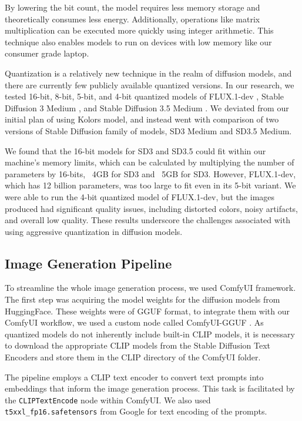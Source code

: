 \documentclass{article}
\begin{document}
By lowering the bit count, the model requires less memory storage and theoretically consumes less energy. Additionally, operations like matrix multiplication can be executed more quickly using integer arithmetic. This technique also enables models to run on devices with low memory like our consumer grade laptop.

Quantization is a relatively new technique in the realm of diffusion models, and there are currently few publicly available quantized versions. In our research, we tested 16-bit, 8-bit, 5-bit, and 4-bit quantized models of FLUX.1-dev \cite{flux}, Stable Diffusion 3 Medium \cite{sd3}, and Stable Diffusion 3.5 Medium \cite{sd3.5}. We deviated from our initial plan of using Kolors model, and instead went with comparison of two versions of Stable Diffusion family of models, SD3 Medium and SD3.5 Medium.


We found that the 16-bit models for SD3 and SD3.5 could fit within our machine's memory limits, which can be calculated by multiplying the number of parameters by 16-bits, ~4GB for SD3 and ~5GB for SD3. However, FLUX.1-dev, which has 12 billion parameters, was too large to fit even in its 5-bit variant.
We were able to run the 4-bit quantized model of FLUX.1-dev, but the images produced had significant quality issues, including distorted colors, noisy artifacts, and overall low quality. These results underscore the challenges associated with using aggressive quantization in diffusion models.

\subsection{Image Generation Pipeline}
To streamline the whole image generation process, we used ComfyUI \cite{comfyui} framework. The first step was acquiring the model weights for the diffusion models from HuggingFace. These weights were of GGUF format, to integrate them with our ComfyUI workflow, we used a custom node called ComfyUI-GGUF \cite{gguf}. As quantized models do not inherently include built-in CLIP \cite{clip} models, it is necessary to download the appropriate CLIP models from the Stable Diffusion Text Encoders and store them in the CLIP directory of the ComfyUI folder.

The pipeline employs a CLIP text encoder to convert text prompts into embeddings that inform the image generation process. This task is facilitated by the \texttt{CLIPTextEncode} node within ComfyUI. We also used \texttt{t5xxl\_fp16.safetensors} \cite{t5} from Google for text encoding of the prompts.
\end{document}
